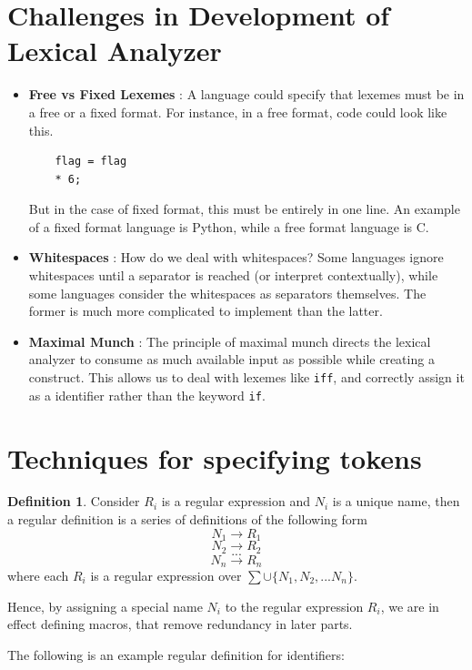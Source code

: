 \documentclass[12pt,letterpaper]{amsbook}
\theoremstyle{definition}
\newtheorem{definition}{Definition}[section] %
\begin{document}
\section{Challenges in Development of Lexical Analyzer}

\begin{itemize}
  \item \textbf{Free vs Fixed Lexemes} : A language could specify that lexemes must be in a free or a fixed format. For instance, in a free format, code could look like this.
    \begin{verbatim}
    flag = flag
    * 6;
    \end{verbatim}
    But in the case of fixed format, this must be entirely in one line. An example of a fixed format language is Python, while a free format language is C.
  \item \textbf{Whitespaces} : How do we deal with whitespaces? Some languages ignore whitespaces until a separator is reached (or interpret contextually), while some languages consider the whitespaces as separators themselves. The former is much more complicated to implement than the latter.
  \item \textbf{Maximal Munch} : The principle of maximal munch directs the lexical analyzer to consume as much available input as possible while creating a construct. This allows us to deal with lexemes like \texttt{iff}, and correctly assign it as a identifier rather than the keyword \texttt{if}.
\end{itemize}

\section{Techniques for specifying tokens} 

\begin{definition}
  Consider $R_i$ is a regular expression and $N_i$ is a unique name, then a regular definition is a series of definitions of the following form 
  \[N_1 \rightarrow R_1 \]
  \[N_2 \rightarrow R_2 \]
  \[...\]
  \[N_n \rightarrow R_n \]
  where each $R_i$ is a regular expression over $\sum \cup \{N_1,N_2,...N_n\}$.
\end{definition}

Hence, by assigning a special name $N_i$ to the regular expression $R_i$, we are in effect defining macros, that remove redundancy in later parts.

The following is an example regular definition for identifiers:
\end{document}
